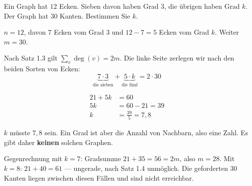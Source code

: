 \begin{aufgabe}
Ein Graph hat $12$ Ecken. Sieben davon haben Grad $3$, die übrigen haben Grad $k$. Der Graph hat $30$ Kanten. Bestimmen Sie $k$.

\loesung
{}
$n = 12$, davon $7$ Ecken vom Grad $3$ und $12 - 7 = 5$ Ecken vom Grad $k$. Weiter $m = 30$.

Nach Satz 1.3 gilt $\sum_{v} \deg(v) = 2m$. Die linke Seite zerlegen wir nach den beiden Sorten von Ecken:
\[ \underbrace{7 \cdot 3}_{\text{die sieben}} + \underbrace{5 \cdot k}_{\text{die fünf}} = 2 \cdot 30 \]

\begin{align*}
21 + 5k &= 60 \\
5k &= 60 - 21 = 39 \\
k &= \frac{39}{5} = 7{,}8
\end{align*}

$k$ müsste $7{,}8$ sein. Ein Grad ist aber die Anzahl von Nachbarn, also eine  Zahl. Es gibt daher \textbf{keinen} solchen Graphen.

Gegenrechnung mit $k = 7$: Gradsumme $21 + 35 = 56 = 2m$, also $m = 28$. Mit $k = 8$: $21 + 40 = 61$ --- ungerade, nach Satz 1.4 unmöglich. Die geforderten $30$ Kanten liegen zwischen diesen Fällen und sind nicht erreichbar.

\begin{center}
\begin{minipage}{0.86\textwidth}
\end{minipage}
\end{center}
\end{aufgabe}

